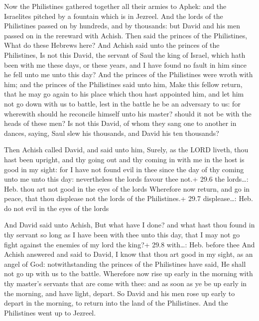  Now the Philistines gathered together all their armies to
Aphek: and the Israelites pitched by a fountain which is in Jezreel.
 And the lords of the Philistines passed on by hundreds, and
by thousands: but David and his men passed on in the rereward with
Achish.  Then said the princes of the Philistines, What do
these Hebrews here? And Achish said unto the princes of the Philistines,
Is not this David, the servant of Saul the king of Israel, which hath
been with me these days, or these years, and I have found no fault in
him since he fell unto me unto this day?  And the princes of
the Philistines were wroth with him; and the princes of the Philistines
said unto him, Make this fellow return, that he may go again to his
place which thou hast appointed him, and let him not go down with us to
battle, lest in the battle he be an adversary to us: for wherewith
should he reconcile himself unto his master? should it not be with the
heads of these men?  Is not this David, of whom they sang
one to another in dances, saying, Saul slew his thousands, and David his
ten thousands?

 Then Achish called David, and said unto him, Surely, as
the LORD liveth, thou hast been upright, and thy going out and thy
coming in with me in the host is good in my sight: for I have not found
evil in thee since the day of thy coming unto me unto this day:
nevertheless the lords favour thee not.+ 29.6 the lords\ldots: Heb. thou
art not good in the eyes of the lords  Wherefore now return,
and go in peace, that thou displease not the lords of the Philistines.+
29.7 displease\ldots: Heb. do not evil in the eyes of the lords

 And David said unto Achish, But what have I done? and
what hast thou found in thy servant so long as I have been with thee
unto this day, that I may not go fight against the enemies of my lord
the king?+ 29.8 with\ldots: Heb. before thee  And Achish
answered and said to David, I know that thou art good in my sight, as an
angel of God: notwithstanding the princes of the Philistines have said,
He shall not go up with us to the battle.  Wherefore now
rise up early in the morning with thy master's servants that are come
with thee: and as soon as ye be up early in the morning, and have light,
depart.  So David and his men rose up early to depart in
the morning, to return into the land of the Philistines. And the
Philistines went up to Jezreel.

